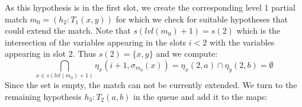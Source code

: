 \documentclass[runningheads]{llncs}
\begin{document}

As this hypothesis is in the first slot, we create the corresponding level 1 partial match $m_0 = {(h_2 : T_1(x, y))}$ for which we check for suitable hypotheses that could extend the match.
Note that  $s(lvl(m_0) + 1) = s(2)$ which is the intersection of the variables appearing in the slots $i < 2$ with the variables appearing in slot $2$.
Thus $s(2) = \{x,y\}$ and we compute:
\[
  \bigcap_{x\in s(lvl(m_0) + 1)} \eta_x \left(i + 1, \sigma_{m_0}(x)\right) = \eta_x(2, a) \cap \eta_y(2, b) = \emptyset
\]
Since the set is empty, the match can not be currently extended.
We turn to the remaining hypothesis $h_3 : T_2(a,b)$ in the queue and add it to the maps:
\end{document}
